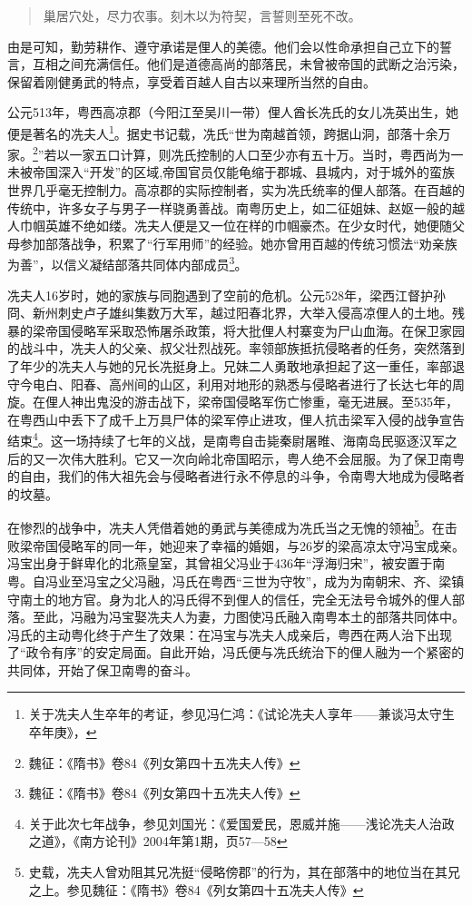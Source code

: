 \begin{quote}
	巢居穴处，尽力农事。刻木以为符契，言誓则至死不改。
\end{quote}

由是可知，勤劳耕作、遵守承诺是俚人的美德。他们会以性命承担自己立下的誓言，互相之间充满信任。他们是道德高尚的部落民，未曾被帝国的武断之治污染，保留着刚健勇武的特点，享受着百越人自古以来理所当然的自由。

公元513年，粤西高凉郡（今阳江至吴川一带）俚人酋长冼氏的女儿冼英出生，她便是著名的冼夫人\footnote{关于冼夫人生卒年的考证，参见冯仁鸿：《试论冼夫人享年——兼谈冯太守生卒年庚》，}。据史书记载，冼氏“世为南越首领，跨据山洞，部落十余万家。\footnote{魏征：《隋书》卷84《列女第四十五冼夫人传》}”若以一家五口计算，则冼氏控制的人口至少亦有五十万。当时，粤西尚为一未被帝国深入“开发”的区域,帝国官员仅能龟缩于郡城、县城内，对于城外的蛮族世界几乎毫无控制力。高凉郡的实际控制者，实为冼氏统率的俚人部落。在百越的传统中，许多女子与男子一样骁勇善战。南粤历史上，如二征姐妹、赵妪一般的越人巾帼英雄不绝如缕。冼夫人便是又一位在样的巾帼豪杰。在少女时代，她便随父母参加部落战争，积累了“行军用师”的经验。她亦曾用百越的传统习惯法“劝亲族为善”，以信义凝结部落共同体内部成员\footnote{魏征：《隋书》卷84《列女第四十五冼夫人传》}。

冼夫人16岁时，她的家族与同胞遇到了空前的危机。公元528年，梁西江督护孙冏、新州刺史卢子雄纠集数万大军，越过阳春北界，大举入侵高凉俚人的土地。残暴的梁帝国侵略军采取恐怖屠杀政策，将大批俚人村寨变为尸山血海。在保卫家园的战斗中，冼夫人的父亲、叔父壮烈战死。率领部族抵抗侵略者的任务，突然落到了年少的冼夫人与她的兄长冼挺身上。兄妹二人勇敢地承担起了这一重任，率部退守今电白、阳春、高州间的山区，利用对地形的熟悉与侵略者进行了长达七年的周旋。在俚人神出鬼没的游击战下，梁帝国侵略军伤亡惨重，毫无进展。至535年，在粤西山中丢下了成千上万具尸体的梁军停止进攻，俚人抗击梁军入侵的战争宣告结束\footnote{关于此次七年战争，参见刘国光：《爱国爱民，恩威并施——浅论冼夫人治政之道》，《南方论刊》2004年第1期，页57—58}。这一场持续了七年的义战，是南粤自击毙秦尉屠睢、海南岛民驱逐汉军之后的又一次伟大胜利。它又一次向岭北帝国昭示，粤人绝不会屈服。为了保卫南粤的自由，我们的伟大祖先会与侵略者进行永不停息的斗争，令南粤大地成为侵略者的坟墓。

在惨烈的战争中，冼夫人凭借着她的勇武与美德成为冼氏当之无愧的领袖\footnote{史载，冼夫人曾劝阻其兄冼挺“侵略傍郡”的行为，其在部落中的地位当在其兄之上。参见魏征：《隋书》卷84《列女第四十五冼夫人传》}。在击败梁帝国侵略军的同一年，她迎来了幸福的婚姻，与26岁的梁高凉太守冯宝成亲。冯宝出身于鲜卑化的北燕皇室，其曾祖父冯业于436年“浮海归宋”，被安置于南粤。自冯业至冯宝之父冯融，冯氏在粤西“三世为守牧”，成为为南朝宋、齐、梁镇守南土的地方官。身为北人的冯氏得不到俚人的信任，完全无法号令城外的俚人部落。至此，冯融为冯宝娶冼夫人为妻，力图使冯氏融入南粤本土的部落共同体中。冯氏的主动粤化终于产生了效果：在冯宝与冼夫人成亲后，粤西在两人治下出现了“政令有序”的安定局面。自此开始，冯氏便与冼氏统治下的俚人融为一个紧密的共同体，开始了保卫南粤的奋斗。

